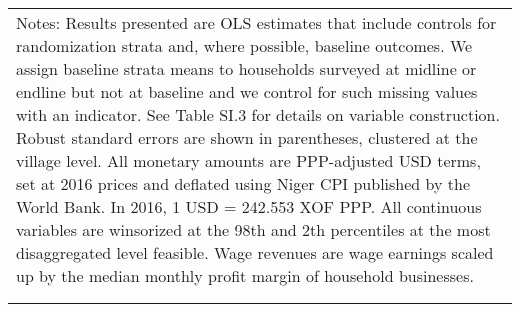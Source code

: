 \begin{longtable}{llcccccccccc}
\multicolumn{12}{p{\textwidth}}{{Notes: Results presented are OLS estimates that include controls for randomization strata and, where possible, baseline outcomes. We assign baseline strata means to households surveyed at midline or endline but not at baseline and we control for such missing values with an indicator. See Table SI.3 for details on variable construction. Robust standard errors are shown in parentheses, clustered at the village level. All monetary amounts are PPP-adjusted USD terms, set at 2016 prices and deflated using Niger CPI published by the World Bank. In 2016, 1 USD = 242.553 XOF PPP. All continuous variables are winsorized at the 98th and 2th percentiles at the most disaggregated level feasible. Wage revenues are wage earnings scaled up by the median monthly profit margin of household businesses. }} \\                                                
\multicolumn{12}{p{\textwidth}}{{}} \\                                                                                                                                                                                                                                                                                                                                                                                                                                                                                                                                                                                                                                                                                                                                                                                                                                                                            
\endlastfoot                                                                                                                                                                                                                                                                                                                                                                                                                                                                                                                                                                                                                                                                                                                                                                                                                                                                                                      

\end{longtable}

